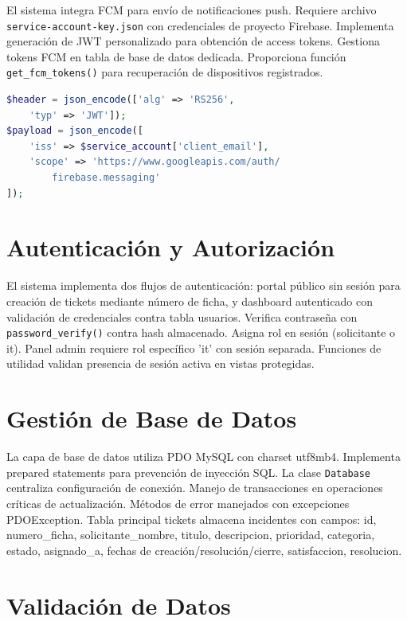 \documentclass[12pt,a4paper]{article}
\begin{document}
El sistema integra FCM para envío de notificaciones push. Requiere archivo \texttt{service-account-key.json} con credenciales de proyecto Firebase. Implementa generación de JWT personalizado para obtención de access tokens. Gestiona tokens FCM en tabla de base de datos dedicada. Proporciona función \texttt{get\_fcm\_tokens()} para recuperación de dispositivos registrados.

\begin{lstlisting}[language=PHP,caption={Generación JWT}]
$header = json_encode(['alg' => 'RS256', 
    'typ' => 'JWT']);
$payload = json_encode([
    'iss' => $service_account['client_email'],
    'scope' => 'https://www.googleapis.com/auth/
        firebase.messaging'
]);
\end{lstlisting}

\section{Autenticación y Autorización}

El sistema implementa dos flujos de autenticación: portal público sin sesión para creación de tickets mediante número de ficha, y dashboard autenticado con validación de credenciales contra tabla usuarios. Verifica contraseña con \texttt{password\_verify()} contra hash almacenado. Asigna rol en sesión (solicitante o it). Panel admin requiere rol específico 'it' con sesión separada. Funciones de utilidad validan presencia de sesión activa en vistas protegidas.

\section{Gestión de Base de Datos}

La capa de base de datos utiliza PDO MySQL con charset utf8mb4. Implementa prepared statements para prevención de inyección SQL. La clase \texttt{Database} centraliza configuración de conexión. Manejo de transacciones en operaciones críticas de actualización. Métodos de error manejados con excepciones PDOException. Tabla principal tickets almacena incidentes con campos: id, numero\_ficha, solicitante\_nombre, titulo, descripcion, prioridad, categoria, estado, asignado\_a, fechas de creación/resolución/cierre, satisfaccion, resolucion.

\section{Validación de Datos}
\end{document}
